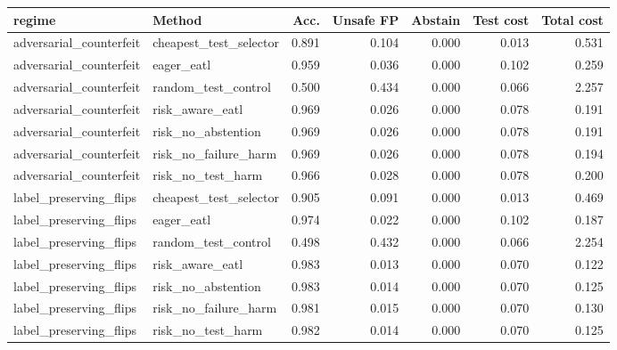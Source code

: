 \begin{tabular}{llrrrrr}
\toprule
regime & Method & Acc. & Unsafe FP & Abstain & Test cost & Total cost \\
\midrule
adversarial\_counterfeit & cheapest\_test\_selector & 0.891 & 0.104 & 0.000 & 0.013 & 0.531 \\
adversarial\_counterfeit & eager\_eatl & 0.959 & 0.036 & 0.000 & 0.102 & 0.259 \\
adversarial\_counterfeit & random\_test\_control & 0.500 & 0.434 & 0.000 & 0.066 & 2.257 \\
adversarial\_counterfeit & risk\_aware\_eatl & 0.969 & 0.026 & 0.000 & 0.078 & 0.191 \\
adversarial\_counterfeit & risk\_no\_abstention & 0.969 & 0.026 & 0.000 & 0.078 & 0.191 \\
adversarial\_counterfeit & risk\_no\_failure\_harm & 0.969 & 0.026 & 0.000 & 0.078 & 0.194 \\
adversarial\_counterfeit & risk\_no\_test\_harm & 0.966 & 0.028 & 0.000 & 0.078 & 0.200 \\
label\_preserving\_flips & cheapest\_test\_selector & 0.905 & 0.091 & 0.000 & 0.013 & 0.469 \\
label\_preserving\_flips & eager\_eatl & 0.974 & 0.022 & 0.000 & 0.102 & 0.187 \\
label\_preserving\_flips & random\_test\_control & 0.498 & 0.432 & 0.000 & 0.066 & 2.254 \\
label\_preserving\_flips & risk\_aware\_eatl & 0.983 & 0.013 & 0.000 & 0.070 & 0.122 \\
label\_preserving\_flips & risk\_no\_abstention & 0.983 & 0.014 & 0.000 & 0.070 & 0.125 \\
label\_preserving\_flips & risk\_no\_failure\_harm & 0.981 & 0.015 & 0.000 & 0.070 & 0.130 \\
label\_preserving\_flips & risk\_no\_test\_harm & 0.982 & 0.014 & 0.000 & 0.070 & 0.125 \\
\bottomrule
\end{tabular}
